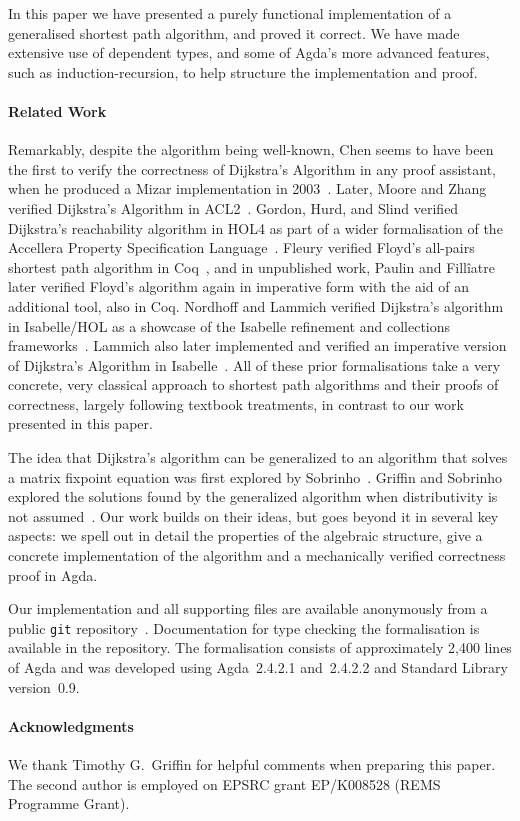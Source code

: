 In this paper we have presented a purely functional implementation of a generalised shortest path algorithm, and proved it correct.
We have made extensive use of dependent types, and some of Agda's more advanced features, such as induction-recursion, to help structure the implementation and proof.

\paragraph{Related Work}
Remarkably, despite the algorithm being well-known, Chen seems to have been the first to verify the correctness of Dijkstra's Algorithm in any proof assistant, when he produced a Mizar implementation in 2003~\cite{chen:dijkstra:2003}.
Later, Moore and Zhang verified Dijkstra's Algorithm in ACL2~\cite{moore:proof-pearl:2005}.
Gordon, Hurd, and Slind verified Dijkstra's reachability algorithm in HOL4 as part of a wider formalisation of the Accellera Property Specification Language~\cite{gordon:executing:2003}.
Fleury verified Floyd's all-pairs shortest path algorithm in Coq~\cite{fleury:implantation:1990}, and in unpublished work, Paulin and Fill\^iatre later verified Floyd's algorithm again in imperative form with the aid of an additional tool, also in Coq.
Nordhoff and Lammich verified Dijkstra's algorithm in Isabelle/HOL as a showcase of the Isabelle refinement and collections frameworks~\cite{nordhoff-dijkstra-2012}.
Lammich also later implemented and verified an imperative version of Dijkstra's Algorithm in Isabelle~\cite{lammich:refinement:2015}.
All of these prior formalisations take a very concrete, very classical approach to shortest path algorithms and their proofs of correctness, largely following textbook treatments, in contrast to our work presented in this paper.


The idea that Dijkstra's algorithm can be generalized to an algorithm that solves a matrix fixpoint equation was first explored by Sobrinho~\cite{sobrinho_algebra_2001}. Griffin and Sobrinho explored the solutions found by the generalized algorithm when distributivity is not assumed~\cite{sobrinho_routing_2010}. Our work builds on their ideas, but goes beyond it in several key aspects: we spell out in detail the properties of the algebraic structure, give a concrete implementation of the algorithm and a mechanically verified correctness proof in Agda.

Our implementation and all supporting files are available anonymously from a public \texttt{git} repository~\cite{markert_formalised_2015}.
Documentation for type checking the formalisation is available in the repository.
The formalisation consists of approximately 2,400 lines of Agda and was developed using Agda~2.4.2.1 and~2.4.2.2 and Standard Library version~0.9.

\paragraph{Acknowledgments}
We thank Timothy G.~Griffin for helpful comments when preparing this paper.
The second author is employed on EPSRC grant EP/K008528 (REMS Programme Grant).
